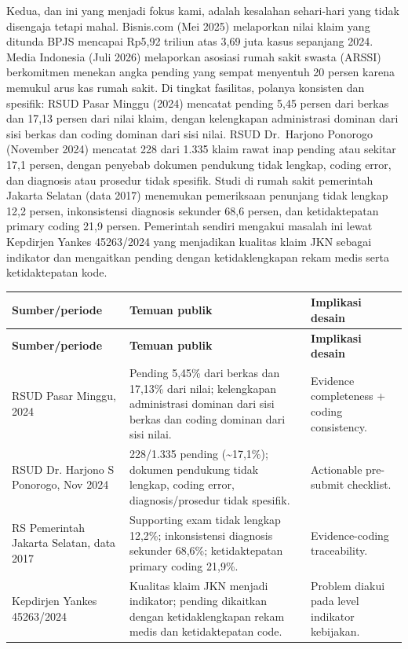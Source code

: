 \documentclass[11pt,a4paper]{article}
\begin{document}
Kedua, dan ini yang menjadi fokus kami, adalah kesalahan sehari-hari yang tidak disengaja tetapi mahal. Bisnis.com (Mei 2025) melaporkan nilai klaim yang ditunda BPJS mencapai Rp5,92 triliun atas 3,69 juta kasus sepanjang 2024. Media Indonesia (Juli 2026) melaporkan asosiasi rumah sakit swasta (ARSSI) berkomitmen menekan angka pending yang sempat menyentuh 20 persen karena memukul arus kas rumah sakit. Di tingkat fasilitas, polanya konsisten dan spesifik: RSUD Pasar Minggu (2024) mencatat pending 5,45 persen dari berkas dan 17,13 persen dari nilai klaim, dengan kelengkapan administrasi dominan dari sisi berkas dan coding dominan dari sisi nilai. RSUD Dr.\ Harjono Ponorogo (November 2024) mencatat 228 dari 1.335 klaim rawat inap pending atau sekitar 17,1 persen, dengan penyebab dokumen pendukung tidak lengkap, coding error, dan diagnosis atau prosedur tidak spesifik. Studi di rumah sakit pemerintah Jakarta Selatan (data 2017) menemukan pemeriksaan penunjang tidak lengkap 12,2 persen, inkonsistensi diagnosis sekunder 68,6 persen, dan ketidaktepatan primary coding 21,9 persen. Pemerintah sendiri mengakui masalah ini lewat Kepdirjen Yankes 45263/2024 yang menjadikan kualitas klaim JKN sebagai indikator dan mengaitkan pending dengan ketidaklengkapan rekam medis serta ketidaktepatan kode.
\begin{longtable}{|p{4cm}|p{7cm}|p{4cm}|}
\hline
\rowcolor{blue!15} \textbf{Sumber/periode} & \textbf{Temuan publik} & \textbf{Implikasi desain} \\ \hline
\endfirsthead
\hline
\rowcolor{blue!15} \textbf{Sumber/periode} & \textbf{Temuan publik} & \textbf{Implikasi desain} \\ \hline
\endhead
RSUD Pasar Minggu, 2024 & Pending 5,45\% dari berkas dan 17,13\% dari nilai; kelengkapan administrasi dominan dari sisi berkas dan coding dominan dari sisi nilai. & Evidence completeness + coding consistency. \\ \hline
RSUD Dr. Harjono S Ponorogo, Nov 2024 & 228/1.335 pending (\textasciitilde{}17,1\%); dokumen pendukung tidak lengkap, coding error, diagnosis/prosedur tidak spesifik. & Actionable pre-submit checklist. \\ \hline
RS Pemerintah Jakarta Selatan, data 2017 & Supporting exam tidak lengkap 12,2\%; inkonsistensi diagnosis sekunder 68,6\%; ketidaktepatan primary coding 21,9\%. & Evidence-coding traceability. \\ \hline
Kepdirjen Yankes 45263/2024 & Kualitas klaim JKN menjadi indikator; pending dikaitkan dengan ketidaklengkapan rekam medis dan ketidaktepatan code. & Problem diakui pada level indikator kebijakan. \\ \hline
\end{longtable}
\end{document}
